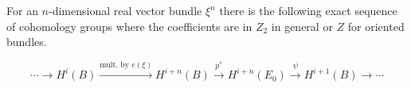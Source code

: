 For an $n$-dimensional real vector bundle $\xi^n$ there is the following exact sequence of cohomology groups where the coefficients are in $Z_2$ in general or $Z$ for oriented bundles.

$$\cdots \rightarrow H^i(B) \xrightarrow{\text{mult. by } e(\xi)} H^{i+n}(B) \xrightarrow{p^*} H^{i+n}(E_0) \xrightarrow{\psi} H^{i+1}(B) \rightarrow \cdots$$
